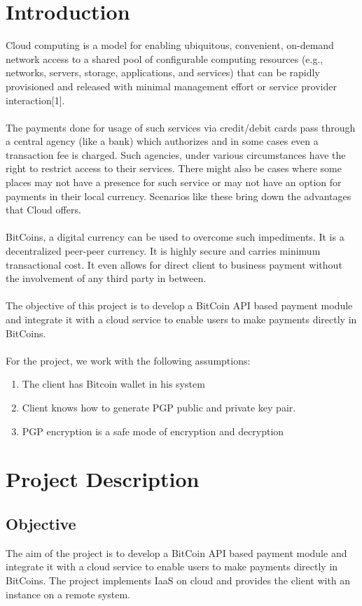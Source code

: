 \documentclass[a4page,12pt]{article}
\begin{document}
\section{Introduction}
Cloud computing is a model for enabling ubiquitous, convenient, on-demand network access to a shared pool of configurable computing resources (e.g., networks, servers, storage, applications, and services) that can be rapidly provisioned and released with minimal management effort or service provider interaction[1].\\\\
The payments done for usage of such services via credit/debit cards pass through a central agency (like a bank) which authorizes and in some cases even a transaction fee is charged. Such agencies, under various circumstances have the right to restrict access to their services. There might also be cases where some places may not have a presence for such service or may not have an option for payments in their local currency. Scenarios like these bring down the advantages that Cloud offers.\\\\
BitCoins, a digital currency can be used to overcome such impediments. It is a decentralized peer-peer currency. It is highly secure and carries minimum transactional cost. It even allows for direct client to business payment without the involvement of any third party in between.\\\\
The objective of this project is to develop a BitCoin API based payment module and integrate it with a cloud service to enable users to make payments directly in BitCoins.\\\\
For the project, we work with the following assumptions:
\begin{enumerate}
\item The client has Bitcoin wallet in his system
\item Client knows how to generate PGP public and private key pair.
\item PGP encryption is a safe mode of encryption and decryption
\end{enumerate}
\section{Project Description}
\vspace{0.2 in}
\subsection{Objective}
The aim of the project is to develop a BitCoin API based payment module and integrate it with a cloud service to enable users to make payments directly in BitCoins. The project implements IaaS on cloud and provides the client with an instance on a remote system.
\vspace{0.2 in}
\end{document}
